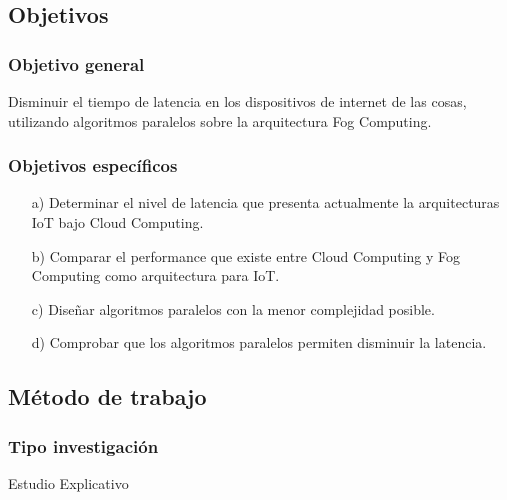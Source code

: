     \subsection{Objetivos}
        \subsubsection{Objetivo general}
            Disminuir el tiempo de latencia en los dispositivos de internet de las cosas, utilizando algoritmos paralelos sobre la arquitectura Fog Computing.
        \subsubsection{Objetivos específicos}
            \begin{enumerate}
                \item[a)] Determinar el nivel de latencia que presenta actualmente la arquitecturas IoT bajo Cloud Computing.
                \item[b)] Comparar el performance que existe entre Cloud Computing y Fog Computing como arquitectura para IoT. 
                \item[c)] Diseñar algoritmos  paralelos con la menor complejidad posible.
                \item[d)] Comprobar que los algoritmos paralelos permiten disminuir la latencia.
            \end{enumerate}
    \subsection{Método de trabajo}    
            \subsubsection{Tipo investigación}
                Estudio Explicativo
